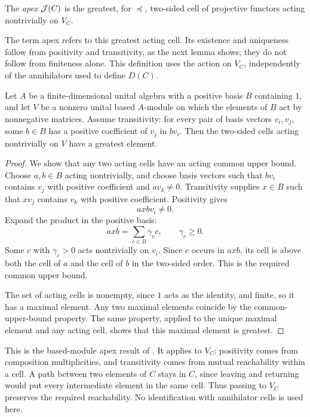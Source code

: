 \begin{defn}\label{def:strict-drop-apex}
The \emph{apex} $\mathcal{J}(C)$ is the greatest, for $\preceq$, two-sided cell
of projective functors acting nontrivially on $V_C$.
\end{defn}

The term apex refers to this greatest acting cell. Its existence and
uniqueness follow from positivity and transitivity, as the next lemma
shows; they do not follow from finiteness alone. This definition uses the
action on $V_C$, independently of the annihilators used to define $D(C)$.

\begin{lem}
\label{lem:strict-drop-unique-apex}
Let $A$ be a finite-dimensional unital algebra with a positive basis $B$
containing $1$, and let $V$ be a nonzero unital based $A$-module on which
the elements of $B$ act by nonnegative matrices. Assume transitivity: for
every pair of basis vectors $v_i,v_j$, some $b\in B$ has a positive
coefficient of $v_j$ in $bv_i$. Then the two-sided cells acting nontrivially
on $V$ have a greatest element.
\end{lem}

\begin{proof}
We show that any two acting cells have an acting common upper bound.
Choose $a,b\in B$ acting nontrivially, and choose basis vectors such that
$bv_i$ contains $v_j$ with positive coefficient and $av_k\neq0$.
Transitivity supplies $x\in B$ such that $xv_j$ contains $v_k$ with
positive coefficient. Positivity gives
\[
  axbv_i\neq0.
\]
Expand the product in the positive basis:
\[
  axb=\sum_{c\in B}\gamma_c c,\qquad\gamma_c\geq0.
\]
Some $c$ with $\gamma_c>0$ acts nontrivially on $v_i$. Since $c$ occurs in
$axb$, its cell is above both the cell of $a$ and the cell of $b$ in the
two-sided order. This is the required common upper bound.

The set of acting cells is nonempty, since $1$ acts as the identity, and
finite, so it has a maximal element. Any two maximal elements coincide
by the common-upper-bound property. The same property, applied to the
unique maximal element and any acting cell, shows that this maximal
element is greatest.
\end{proof}

This is the based-module apex result of
\cite[Prop.~14 and \S9.2]{KildetoftMazorchuk2016}. It applies to $V_C$:
positivity comes from composition multiplicities, and transitivity comes
from mutual reachability within a cell. A path between two elements of
$C$ stays in $C$, since leaving and returning would put every intermediate
element in the same cell. Thus passing to $V_C$ preserves the required
reachability. No identification with annihilator cells is used here.

